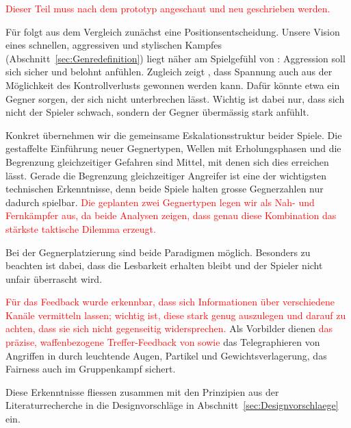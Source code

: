 \documentclass[../Main.tex]{subfiles}
\begin{document}
\textcolor{red}{Dieser Teil muss nach dem prototyp angeschaut und neu geschrieben werden.}

Für  folgt aus dem Vergleich zunächst eine Positionsentscheidung. Unsere Vision eines schnellen, aggressiven und stylischen Kampfes (Abschnitt~\ref{sec:Genredefinition}) liegt näher am Spielgefühl von : Aggression soll sich sicher und belohnt anfühlen. Zugleich zeigt , dass Spannung auch aus der Möglichkeit des Kontrollverlusts gewonnen werden kann. Dafür könnte etwa ein Gegner sorgen, der sich nicht unterbrechen lässt. Wichtig ist dabei nur, dass sich nicht der Spieler schwach, sondern der Gegner übermässig stark anfühlt.

Konkret übernehmen wir die gemeinsame Eskalationsstruktur beider Spiele. Die gestaffelte Einführung neuer Gegnertypen, Wellen mit Erholungsphasen und die Begrenzung gleichzeitiger Gefahren sind Mittel, mit denen sich dies erreichen lässt. Gerade die Begrenzung gleichzeitiger Angreifer ist eine der wichtigsten technischen Erkenntnisse, denn beide Spiele halten grosse Gegnerzahlen nur dadurch spielbar. \textcolor{red}{Die geplanten zwei Gegnertypen legen wir als Nah- und Fernkämpfer aus, da beide Analysen zeigen, dass genau diese Kombination das stärkste taktische Dilemma erzeugt.}

Bei der Gegnerplatzierung sind beide Paradigmen möglich. Besonders zu beachten ist dabei, dass die Lesbarkeit erhalten bleibt und der Spieler nicht unfair überrascht wird.

\textcolor{red}{Für das Feedback wurde erkennbar, dass sich Informationen über verschiedene Kanäle vermitteln lassen; wichtig ist, diese stark genug auszulegen und darauf zu achten, dass sie sich nicht gegenseitig widersprechen.} Als Vorbilder dienen \textcolor{red}{das präzise, waffenbezogene Treffer-Feedback von  sowie} das Telegraphieren von Angriffen in  durch leuchtende Augen, Partikel und Gewichtsverlagerung, das Fairness auch im Gruppenkampf sichert.

Diese Erkenntnisse fliessen zusammen mit den Prinzipien aus der Literaturrecherche in die Designvorschläge in Abschnitt~\ref{sec:Designvorschlaege} ein.
\end{document}
